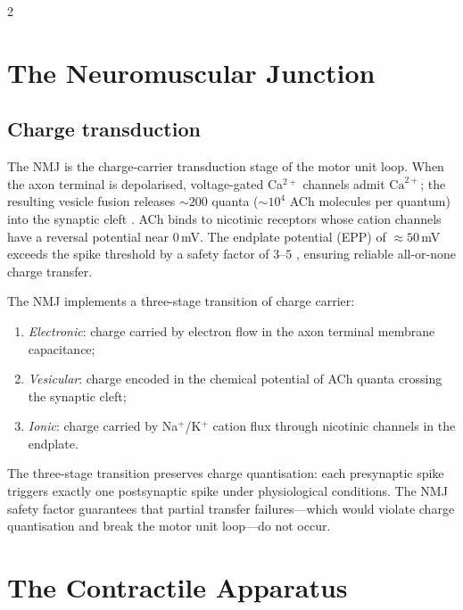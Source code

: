 \begin{multicols}{2}

\section{The Neuromuscular Junction}
\label{sec:ch06-nmj}

\subsection{Charge transduction}

The NMJ is the charge-carrier transduction stage of the motor unit loop.
When the axon terminal is depolarised, voltage-gated Ca$^{2+}$ channels admit
$\mathrm{Ca}^{2+}$; the resulting vesicle fusion releases $\sim 200$ quanta
($\sim 10^{4}$ ACh molecules per quantum) into the synaptic cleft
\citep{katz1967,katz1972}.  ACh binds to nicotinic receptors whose cation
channels have a reversal potential near $0$\,mV.  The endplate potential
(EPP) of $\approx 50$\,mV exceeds the spike threshold by a safety factor of
$3$--$5$ \citep{wood2001,ruff2011}, ensuring reliable all-or-none charge
transfer.

\begin{definition}
\label{def:ch06-nmj-partition}
The NMJ implements a three-stage transition of charge carrier:
\begin{enumerate}[label=(\roman*),itemsep=2pt]
  \item \emph{Electronic}: charge carried by electron flow in the axon
        terminal membrane capacitance;
  \item \emph{Vesicular}: charge encoded in the chemical potential of ACh
        quanta crossing the synaptic cleft;
  \item \emph{Ionic}: charge carried by Na$^+$/K$^+$ cation flux through
        nicotinic channels in the endplate.
\end{enumerate}
\end{definition}

The three-stage transition preserves charge quantisation: each presynaptic
spike triggers exactly one postsynaptic spike under physiological conditions.
The NMJ safety factor guarantees that partial transfer failures---which would
violate charge quantisation and break the motor unit loop---do not occur.

\section{The Contractile Apparatus}
\label{sec:ch06-contractile}


\end{multicols}
